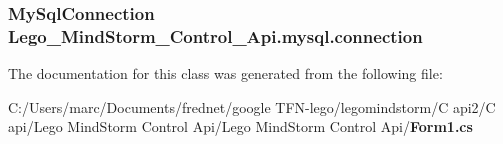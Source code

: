 \subsubsection[{connection}]{\setlength{\rightskip}{0pt plus 5cm}MySqlConnection {\bf Lego\_\-MindStorm\_\-Control\_\-Api.mysql.connection}\hspace{0.3cm}{\tt  [static]}}\label{class_lego___mind_storm___control___api_1_1mysql_71fe9f91ac2a14ef804254dab2937bf5}




The documentation for this class was generated from the following file:\begin{CompactItemize}
\item 
C:/Users/marc/Documents/frednet/google TFN-lego/legomindstorm/C api2/C api/Lego MindStorm Control Api/Lego MindStorm Control Api/{\bf Form1.cs}\end{CompactItemize}
